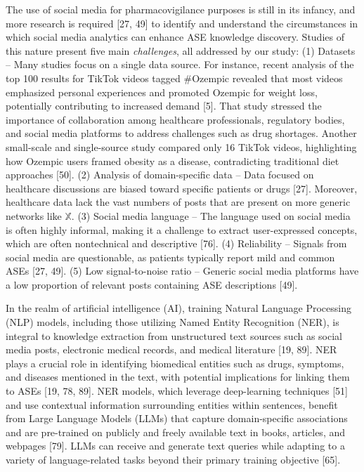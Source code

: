 \documentclass[referee,bst/sn-basic]{sn-jnl}%
\begin{document}
The use of social media for pharmacovigilance purposes is still in its infancy, and more research is required [27, 49] 
to identify and understand the circumstances in which social media analytics can enhance ASE knowledge discovery. 
Studies of this nature present five main \textit{challenges}, all  addressed by our study:
(1) Datasets -- Many studies focus on a single data source.
    For instance, recent analysis of the top 100 results for TikTok videos tagged \#Ozempic revealed that most videos emphasized personal experiences and promoted Ozempic for weight loss, potentially contributing to increased demand [5]. 
    That study stressed the importance of collaboration among healthcare professionals, regulatory bodies, and social media platforms to address challenges such as drug shortages. 
    Another small-scale and single-source study compared only 16 TikTok videos, highlighting how Ozempic users framed obesity as a disease, contradicting traditional diet approaches [50]. 
(2)
    Analysis of domain-specific data -- Data focused on healthcare discussions are biased toward specific patients or drugs [27]. 
    Moreover, healthcare data lack the vast numbers of posts that are present on more generic networks like $\mathbb{X}$.
(3)
    Social media language -- The language used on social media is often highly informal, making it a challenge to extract user-expressed concepts, which are often nontechnical and descriptive [76]. 
(4)
     Reliability -- Signals from social media are questionable, as patients typically report mild and common ASEs [27, 49]. 
(5)
    Low signal-to-noise ratio -- Generic social media platforms have a low proportion of relevant posts containing ASE descriptions [49]. 

In the realm of artificial intelligence (AI), training Natural Language Processing (NLP) models, including those utilizing Named Entity Recognition (NER), is integral to knowledge extraction from unstructured text sources such as social media posts, electronic medical records, and medical literature [19, 89]. 
NER plays a crucial role in identifying biomedical entities such as drugs, symptoms, and diseases mentioned in the text, with potential implications for linking them to ASEs [19, 78, 89]. 
NER models, which leverage deep-learning techniques [51] 
and use contextual information surrounding entities within sentences, benefit from Large Language Models (LLMs) that capture domain-specific associations and are pre-trained on publicly and freely available text in books, articles, and webpages [79]. 
LLMs can receive and generate text queries while adapting to a variety of language-related tasks beyond their primary training objective [65]. 
\end{document}
